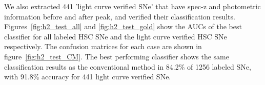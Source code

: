 \documentclass[proof]{pasj01}
\begin{document}
We also extracted 441 'light curve verified SNe' that have spec-z and photometric information before and after peak, and verified their classification results.
Figures\ \ref{fig:h2_test_all} and \ref{fig:h2_test_gold} show the AUCs of the best classifier for all labeled HSC SNe and the light curve verified HSC SNe respectively.
The confusion matrices for each case are shown in figure\ \ref{fig:h2_test_CM}.
The best performing classifier shows the same classification results as the conventional method in 84.2\% of 1256 labeled SNe, with 91.8\% accuracy for 441 light curve verified SNe.
%
%
%
%
\end{document}
